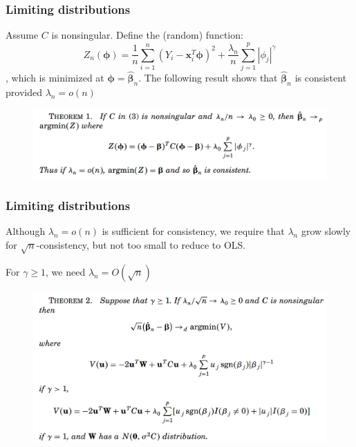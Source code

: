 \documentclass{beamer}
\begin{document}
	\begin{frame}
		\frametitle{Limiting distributions}
		Assume $C$ is nonsingular. Define the (random) function:
		$$Z_n(\bm{\phi}) = \frac{1}{n}\sum_{i=1}^{n}(Y_i-\bm{x}_i^T\bm{\phi})^2 + \frac{\lambda_n}{n}\sum_{j=1}^{p}|\phi_j|^{\gamma}$$
		, which is minimized at $\bm{\phi} = \hat{\bm{\beta}}_n$. The following result shows that $\hat{\bm{\beta}}_n$ is consistent provided $\lambda_n = o(n)$
		\begin{figure}
			\includegraphics[width=1\linewidth]{image001.png}
		\end{figure}
	\end{frame}
	
	\begin{frame}
		\frametitle{Limiting distributions}
		Although $\lambda_n = o(n)$ is sufficient for consistency, we require that $\lambda_n$ grow slowly for $\sqrt{n}$-consistency, but not too small to reduce to OLS.
		
		For $\gamma \geq 1$, we need $\lambda_n = O(\sqrt{n})$
		\begin{figure}
			\includegraphics[width=1\linewidth]{image002.png}
		\end{figure}
	\end{frame}
	
\end{document}
